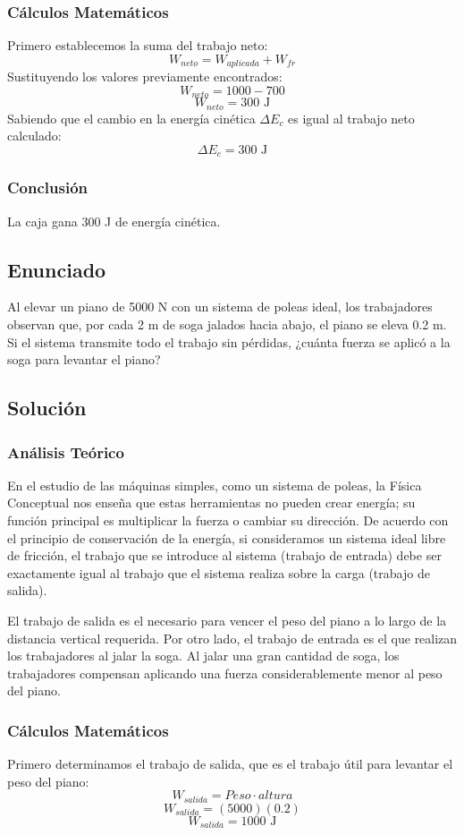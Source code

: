 \documentclass[a4paper,12pt]{article}
\begin{document}
\subsubsection*{Cálculos Matemáticos}
Primero establecemos la suma del trabajo neto:
$$W_{neto}=W_{aplicada}+W_{fr}$$
Sustituyendo los valores previamente encontrados:
$$W_{neto}=1000-700$$
$$W_{neto}=300\text{ J}$$
Sabiendo que el cambio en la energía cinética $\Delta E_c$ es igual al trabajo neto calculado:
$$\Delta E_c=300\text{ J}$$

\subsubsection*{Conclusión}
La caja gana 300 J de energía cinética.

\newpage
\subsection*{Enunciado}
Al elevar un piano de 5000 N con un sistema de poleas ideal, los trabajadores observan que, por cada 2 m de soga jalados hacia abajo, el piano se eleva 0.2 m. Si el sistema transmite todo el trabajo sin pérdidas, ¿cuánta fuerza se aplicó a la soga para levantar el piano?

\subsection*{Solución}
\subsubsection*{Análisis Teórico}
En el estudio de las máquinas simples, como un sistema de poleas, la Física Conceptual nos enseña que estas herramientas no pueden crear energía; su función principal es multiplicar la fuerza o cambiar su dirección. De acuerdo con el principio de conservación de la energía, si consideramos un sistema ideal libre de fricción, el trabajo que se introduce al sistema (trabajo de entrada) debe ser exactamente igual al trabajo que el sistema realiza sobre la carga (trabajo de salida). 

El trabajo de salida es el necesario para vencer el peso del piano a lo largo de la distancia vertical requerida. Por otro lado, el trabajo de entrada es el que realizan los trabajadores al jalar la soga. Al jalar una gran cantidad de soga, los trabajadores compensan aplicando una fuerza considerablemente menor al peso del piano.

\subsubsection*{Cálculos Matemáticos}
Primero determinamos el trabajo de salida, que es el trabajo útil para levantar el peso del piano:
$$W_{salida}=Peso\cdot altura$$
$$W_{salida}=(5000)(0.2)$$
$$W_{salida}=1000\text{ J}$$
\end{document}
